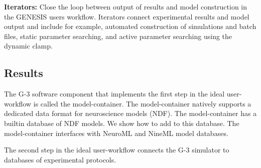 \documentclass[12pt]{article}
\begin{document}
{\bf Iterators:} Close the loop between output of results and model
construction in the GENESIS users workflow. Iterators connect
experimental results and model output and include for example,
automated construction of simulations and batch files, static
parameter searching, and active parameter searching using the dynamic
clamp.

\subsection*{Results}

The G-3 software component that implements the first step in the ideal
user-workflow is called the model-container.  The model-container
natively supports a dedicated data format for neuroscience models
(NDF).  The model-container has a builtin database of NDF models.  We
show how to add to this database.  The model-container interfaces with
NeuroML and NineML model databases.

The second step in the ideal user-workflow connects the G-3 simulator
to databases of experimental protocols.
\end{document}
